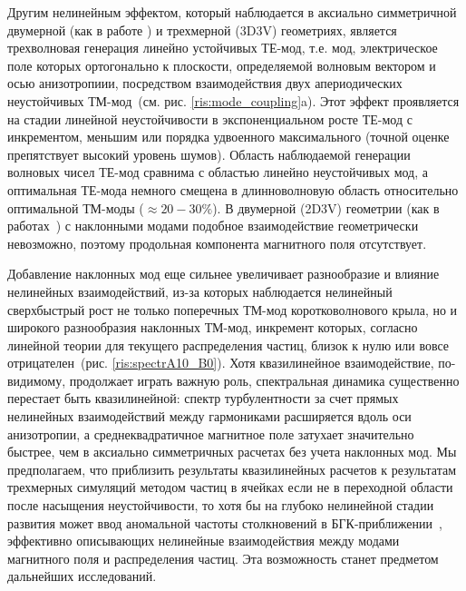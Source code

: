 Другим нелинейным эффектом, который наблюдается в аксиально симметричной двумерной (как в работе \cite{Kuznetsov2023}) и трехмерной (3D3V) геометриях, является трехволновая генерация линейно устойчивых ТЕ-мод, т.е. мод, электрическое поле которых ортогонально к плоскости, определяемой волновым вектором и осью анизотропиии, посредством взаимодействия двух апериодических неустойчивых ТМ-мод~(см. рис. \ref{ris:mode_coupling}a). Этот эффект проявляется на стадии линейной неустойчивости в экспоненциальном росте ТЕ-мод с инкрементом, меньшим или порядка удвоенного максимального (точной оценке препятствует высокий уровень шумов). Область наблюдаемой генерации волновых чисел ТЕ-мод сравнима с областью линейно неустойчивых мод, а оптимальная ТЕ-мода немного смещена в длинноволновую область относительно оптимальной ТМ-моды ($\approx20-30\%$). В двумерной (2D3V) геометрии (как в работах~\cite{Camporeale2008,Hellinger2014}) с наклонными модами подобное взаимодействие геометрически невозможно, поэтому продольная компонента магнитного поля отсутствует. 



Добавление наклонных мод еще сильнее увеличивает разнообразие и влияние нелинейных взаимодействий, из-за которых наблюдается нелинейный сверхбыстрый рост не только поперечных ТМ-мод коротковолнового крыла, но и широкого разнообразия наклонных ТМ-мод, инкремент которых, согласно линейной теории для текущего распределения частиц, близок к нулю или вовсе отрицателен~(рис. \ref{ris:spectrA10_B0}). Хотя квазилинейное взаимодействие, по-видимому, продолжает играть важную роль, спектральная динамика существенно перестает быть квазилинейной: спектр турбулентности за счет прямых нелинейных взаимодействий между гармониками расширяется вдоль оси анизотропии, а среднеквадратичное магнитное поле затухает значительно быстрее, чем в аксиально симметричных расчетах без учета наклонных мод. Мы предполагаем, что приблизить результаты квазилинейных расчетов к результатам трехмерных симуляций методом частиц в ячейках если не в переходной области после насыщения неустойчивости, то хотя бы на глубоко нелинейной стадии развития может ввод аномальной частоты столкновений в БГК-приближении~\cite{Bhatnagar1954,Medvedev2017}, эффективно описывающих нелинейные взаимодействия между модами магнитного поля и распределения частиц. Эта возможность станет предметом дальнейших исследований.

